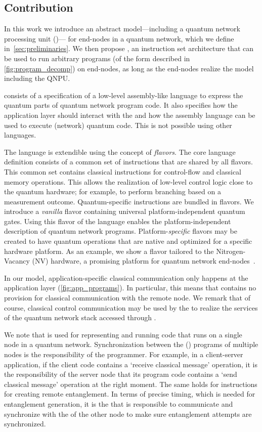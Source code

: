\subsection{Contribution}
In this work we introduce an abstract model---including a quantum network processing unit (\QNPU)--- for end-nodes in a quantum network, which we define in~\cref{sec:preliminaries}.
We then propose \netqasm, an instruction set architecture that can be used to run arbitrary programs (of the form described in \cref{fig:program_decomp}) on end-nodes, as long as the end-nodes realize the model including the QNPU.

\netqasm consists of a specification of a low-level assembly-like language to express the quantum parts of quantum network program code.
It also specifies how the application layer should interact with the \QNPU and how the assembly language can be used to execute (network) quantum code.
This is not possible using other \qasm languages.

The \netqasm language is extendible using the concept of \textit{flavors}.
The core language definition consists of a common set of instructions that are shared by all flavors.
This common set contains classical instructions for control-flow and classical memory operations.
This allows the realization of low-level control logic close to the quantum hardware;
for example, to perform branching based on a measurement outcome.
Quantum-specific instructions are bundled in flavors.
We introduce a \textit{vanilla} flavor containing universal platform-independent quantum gates.
Using this flavor of the \netqasm language enables the platform-independent description of quantum network programs.
Platform-\textit{specific} flavors may be created to have quantum operations that are native and optimized for a specific hardware platform.
As an example, we show a flavor tailored to the Nitrogen-Vacancy (NV) hardware, a promising platform for quantum network end-nodes~\cite{Taminiau2014, hanson2021realization}.

In our model, application-specific classical communication only happens at the application layer (\cref{fig:app_programs}).
In particular, this means that \netqasm contains no provision for classical communication with the remote node.
We remark that of course, classical control communication may be used by the \QNPU to realize the services of the quantum network stack accessed through \netqasm.

We note that \netqasm is used for representing and running code that runs on a single node in a quantum network.
Synchronization between the (\netqasm) programs of multiple nodes is the responsibility of the programmer.
For example, in a client-server application, if the client code contains a `receive classical message' operation, it is the responsibility of the server node that its program code contains a `send classical message' operation at the right moment.
The same holds for instructions for creating remote entanglement.
In terms of precise timing, which is needed for entanglement generation, it is the \QNPU that is responsible to communicate and synchronize with the \QNPU of the other node to make sure entanglement attempts are synchronized.

